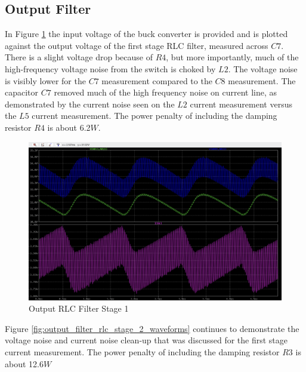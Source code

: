 \documentclass[conference]{IEEEtran}
\begin{document}
\subsection{Output Filter}
In Figure \ref{fig:output_filter_rlc_stage_1_waveforms} the input voltage of the buck converter is provided and is plotted against the output voltage of the first stage RLC filter, measured across $C7$. There is a slight voltage drop because of $R4$, but more importantly, much of the high-frequency voltage noise from the switch is choked by $L2$. The voltage noise is visibly lower for the $C7$ measurement compared to the $C8$ measurement. The capacitor $C7$ removed much of the high frequency noise on current line, as demonstrated by the current noise seen on the $L2$ current measurement versus the $L5$ current measurement. The power penalty of including the damping resistor $R4$ is about 6.2$W$.

\begin{figure}[htp]
    \centering
    \includegraphics[width=1.0\linewidth]{output_filter_rlc_stage_1.png}
    \caption{Output RLC Filter Stage 1}
    \label{fig:output_filter_rlc_stage_1_waveforms}
\end{figure}

Figure \ref{fig:output_filter_rlc_stage_2_waveforms} continues to demonstrate the voltage noise and current noise clean-up that was discussed for the first stage current measurement. The power penalty of including the damping resistor $R3$ is about 12.6$W$
\end{document}
